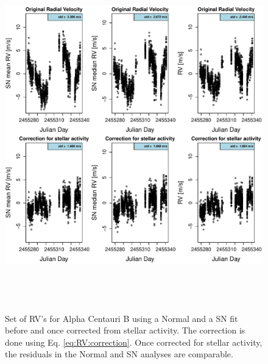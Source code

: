 \documentclass[11pt, oneside]{article}
\begin{document}
\begin{figure} 
   \centering
\includegraphics[height = 6in]{NEW_CORRECTIONHD12862_[3]CorrectionActivity_RadialVelocity_vs_time.pdf} 
   \caption{Set of RV's for Alpha Centauri B using a Normal and a SN fit before and once corrected from stellar activity. The correction is done using Eq. \ref{eq:RV:correction}. Once corrected for stellar activity, the residuals in the Normal and SN analyses are comparable.}
   \label{fig:alphacent:correctionRV}
\end{figure}
\end{document}
